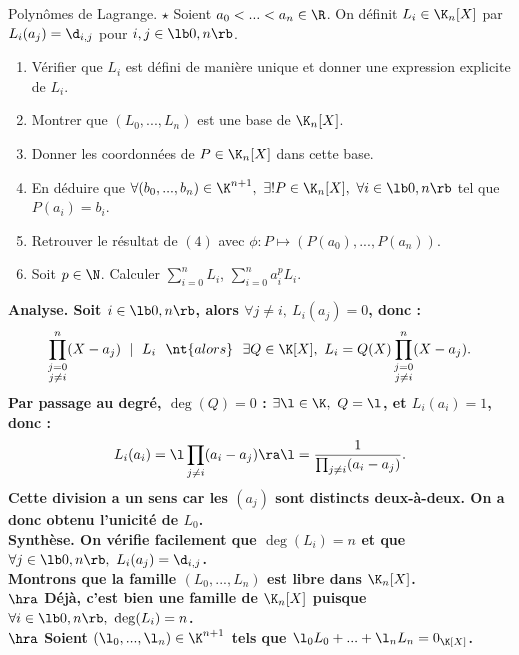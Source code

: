 \documentclass[11pt]{article}
\begin{document}
\begin{exercice}{Polynômes de Lagrange. $\star$}{}
    Soient $a_0<...<a_n\in\R$. On définit $L_i\in\K_n[X]$ par $L_i(a_j)=\d_{i,j}$ pour $i,j\in\lb0,n\rb$.
    \begin{enumerate}
        \item Vérifier que $L_i$ est défini de manière unique et donner une expression explicite de $L_i$.
        \item Montrer que $(L_0,...,L_n)$ est une base de $\K_n[X]$.
        \item Donner les coordonnées de $P\in\K_n[X]$ dans cette base.
        \item En déduire que $\forall (b_0,...,b_n)\in\K^{n+1}, ~ \exists!P\in\K_n[X], ~ \forall i \in \lb0,n\rb$ tel que $P(a_i)=b_i$.
        \item Retrouver le résultat de $(4)$ avec $\phi:P\mapsto(P(a_0),...,P(a_n))$.
        \item Soit $p\in\N$. Calculer $\sum_{i=0}^nL_i$, $\sum_{i=0}^na_i^pL_i$.
    \end{enumerate}
    \tcblower
    \small
     \bf{Analyse.} Soit $i\in\lb0,n\rb$, alors $\forall j \neq i, ~ L_i(a_j) = 0$, donc :
    \begin{equation*}
        \prod_{\substack{j=0 \\ j\neq i}}^n (X-a_j) ~ \mid ~ L_i ~~\nt{alors}~~ \exists Q \in \K[X], ~ L_i = Q(X)\prod_{\substack{j=0\\j\neq i}}^n(X-a_j).
    \end{equation*}
    Par passage au degré, $\deg(Q)=0$ : $\exists \l \in \K, ~ Q = \l$, et $L_i(a_i) = 1$, donc :
    \begin{equation*}
        L_i(a_i) = \l \prod_{j\neq i}(a_i - a_j) \ra \l = \frac{1}{\prod_{j\neq i}(a_i - a_j)}.
    \end{equation*}
    Cette division a un sens car les $(a_j)$ sont distincts deux-à-deux. On a donc obtenu l'unicité de $L_0$.\\
    \bf{Synthèse.} On vérifie facilement que $\deg(L_i)=n$ et que $\forall j \in \lb0,n\rb, ~ L_i(a_j)=\d_{i,j}$.\\
     Montrons que la famille $(L_0,...,L_n)$ est libre dans $\K_n[X]$.\\
    $\hra$ Déjà, c'est bien une famille de $\K_n[X]$ puisque $\forall i \in \lb0,n\rb, ~ \deg(L_i)=n$.\\
    $\hra$ Soient $(\l_0,...,\l_n)\in\K^{n+1}$ tels que $\l_0L_0+...+\l_nL_n=0_{\K[X]}$.\\

\end{exercice}
\end{document}
